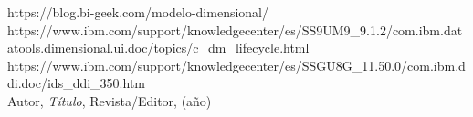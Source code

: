 \begin{thebibliography}{99}
https://blog.bi-geek.com/modelo-dimensional/\\
https://www.ibm.com/support/knowledgecenter/es/SS9UM9_9.1.2/com.ibm.datatools.dimensional.ui.doc/topics/c_dm_lifecycle.html\\
https://www.ibm.com/support/knowledgecenter/es/SSGU8G_11.50.0/com.ibm.ddi.doc/ids_ddi_350.htm\\

 Autor, \emph{Título}, Revista/Editor, (año)

\end{thebibliography}




